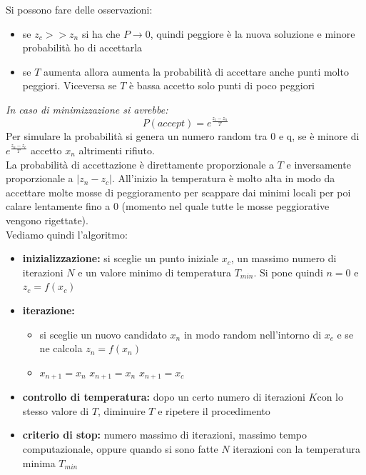 \documentclass[a4paper,12pt, oneside]{book}
\begin{document}
Si possono fare delle osservazioni:
\begin{itemize}
  \item se $z_c>>z_n$ si ha che $P\to 0$, quindi peggiore è la nuova
  soluzione e minore probabilità ho di accettarla
  \item se $𝑇$ aumenta allora aumenta la probabilità di accettare
  anche punti molto peggiori. Viceversa se $T$ è bassa accetto solo
  punti di poco peggiori 
\end{itemize}
\textit{In caso di minimizzazione si avrebbe:}
\[P(accept)=e^{\frac{z_c-z_n}{T}}\]
Per simulare la probabilità si genera un numero random tra 0 e q, se è
minore di $e^{\frac{z_n-z_c}{T}}$ accetto $x_n$ altrimenti rifiuto. \\
La probabilità di accettazione è direttamente proporzionale a $T$ e
inversamente proporzionale a $|z_n-z_c|$. All’inizio la temperatura è
molto alta in modo da accettare molte mosse di peggioramento per
scappare dai minimi locali per poi calare lentamente fino a 0 (momento
nel quale tutte le mosse peggiorative vengono rigettate).\\
Vediamo quindi l'algoritmo:
\begin{itemize}
  \item \textbf{inizializzazione:} si sceglie un punto iniziale $x_c$,
  un massimo numero di iterazioni $N$ e un valore minimo di
  temperatura $T_{min}$. Si pone quindi $n=0$ e $z_c=f(x_c)$
  \item \textbf{iterazione:}
  \begin{itemize}
    \item si sceglie un nuovo candidato $x_n$ in modo random
    nell'intorno di $x_c$ e se ne calcola $z_n=f(x_n)$
    \item
    \begin{algorithmic}
      \State $x_{n+1}=x_n$
      \Else
      \State $x_{n+1}=x_n$
      \Else
      \State $x_{n+1}=x_c$
      \EndIf
      \EndIf
    \end{algorithmic}
  \end{itemize}
  \item \textbf{controllo di temperatura:} dopo un certo numero di
  iterazioni $𝐾$con lo stesso valore di $T$, diminuire $T$ e ripetere
  il procedimento
  \item \textbf{criterio di stop:} numero massimo di iterazioni,
  massimo tempo computazionale, oppure quando si sono fatte
  $N$ iterazioni con la temperatura minima $T_{min}$
\end{itemize}
\end{document}
